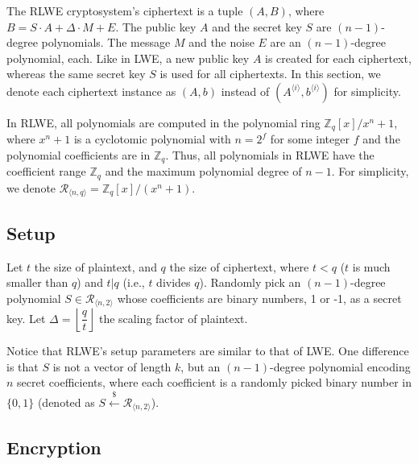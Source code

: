 The RLWE cryptosystem's ciphertext is a tuple $(A, B)$, where $B = S \cdot A + \Delta \cdot M + E$. The public key $A$ and the secret key $S$ are $(n-1)$-degree polynomials. The message $M$ and the noise $E$ are an $(n-1)$-degree polynomial, each. Like in LWE, a new public key $A$ is created for each ciphertext, whereas the same secret key $S$ is used for all ciphertexts. In this section, we denote each ciphertext instance as $(A, b)$ instead of $(A^{\langle i \rangle}, b^{\langle i \rangle})$ for simplicity.

In RLWE, all polynomials are computed in the polynomial ring $\mathbb{Z}_q[x] / x^n + 1$, where $x^n + 1$ is a cyclotomic polynomial with $n = 2^f$ for some integer $f$ and the polynomial coefficients are in $\mathbb{Z}_q$. Thus, all polynomials in RLWE have the coefficient range $\mathbb{Z}_q$ and the maximum polynomial degree of $n -1$. For simplicity, we denote $\mathcal{R}_{\langle n,q \rangle} = \mathbb{Z}_q[x] / (x^n + 1)$.

\subsection{Setup}

Let $t$ the size of plaintext, and $q$ the size of ciphertext, where $t < q$ ($t$ is much smaller than $q$) and $t | q$ (i.e., $t$ divides $q$). Randomly pick an $(n-1)$-degree polynomial $S \in \mathcal{R}_{\langle n, 2 \rangle}$ whose coefficients are binary numbers, 1 or -1, as a secret key. Let $\Delta = \left\lfloor\dfrac{q}{t}\right\rfloor$ the scaling factor of plaintext.

Notice that RLWE's setup parameters are similar to that of LWE. One difference is that $S$ is not a vector of length $k$, but an $(n-1)$-degree polynomial encoding $n$ secret coefficients, where each coefficient is a randomly picked binary number in $\{0, 1\}$ (denoted as $S \xleftarrow{\$} \mathcal{R}_{\langle n, 2 \rangle}$).


\subsection{Encryption}
\label{subsec:rlwe-enc}

